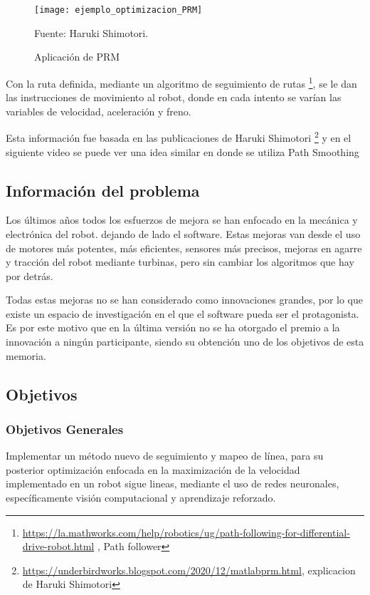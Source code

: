 \begin{figure}[h]
\centering
\texttt{[image: ejemplo\_optimizacion\_PRM]}
\caption{\label{fig:PRM} Aplicación de PRM} Fuente: Haruki Shimotori.
\end{figure}

\newpage
Con la ruta definida, mediante un algoritmo de seguimiento de rutas \footnote{\url{https://la.mathworks.com/help/robotics/ug/path-following-for-differential-drive-robot.html} , Path follower}, se le dan las instrucciones de movimiento al robot, donde en cada intento se varían las variables de velocidad, aceleración y freno.

Esta información fue basada en las publicaciones de Haruki Shimotori \footnote{\url{https://underbirdworks.blogspot.com/2020/12/matlabprm.html}, explicacion de Haruki Shimotori } y en el siguiente video se puede ver una idea similar en donde se utiliza Path Smoothing \cite{pathsmoothing}

\subsection{Información del problema}
Los últimos años todos los esfuerzos de mejora se han enfocado en la mecánica y electrónica del robot. dejando de lado el software. Estas mejoras van desde el uso de motores más potentes, más eficientes, sensores más precisos, mejoras en agarre y tracción del robot mediante turbinas, pero sin cambiar los algoritmos que hay por detrás.

Todas estas mejoras no se han considerado como innovaciones grandes, por lo que existe un espacio de investigación en el que el software pueda ser el protagonista. Es por este motivo que en la última versión no se ha otorgado el premio a la innovación a ningún participante, siendo su obtención uno de los objetivos de esta memoria.

\subsection{Objetivos}

\subsubsection{Objetivos Generales}

Implementar un método nuevo de seguimiento y mapeo de línea, para su posterior optimización enfocada en la maximización de la velocidad implementado en un robot sigue lineas,  mediante el uso de redes neuronales, específicamente visión computacional y aprendizaje reforzado.

